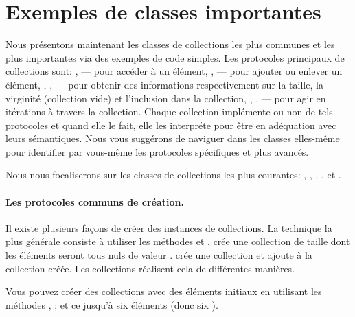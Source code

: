 \documentclass[a4paper,10pt,twoside]{book}
\begin{document}
\section{Exemples de classes importantes}
Nous présentons maintenant les classes de collections les plus communes et les plus importantes via des exemples de code simples.
Les protocoles principaux de collections sont: ,  --- pour accéder à un élément, ,  --- pour ajouter ou enlever un élément, , ,  --- pour obtenir des informations respectivement sur la taille, la virginité (collection vide) et l'inclusion dans la collection, , ,  --- pour agir en itérations à travers la collection.
Chaque collection implémente ou non de tels protocoles et quand elle 
le fait, elle les interpréte pour être en adéquation avec leurs sémantiques.
Nous vous suggérons de naviguer dans les classes elles-même pour
identifier par vous-même les protocoles spécifiques et plus avancés.

Nous nous focaliserons sur les classes de collections les plus courantes:
, , , ,  et .

\paragraph{Les protocoles communs de création.}
Il existe plusieurs façons de créer des instances de collections.
La technique la plus générale consiste à utiliser les méthodes
 et .
 crée une collection de taille  
dont les éléments seront tous nuls \cad de valeur . 
  crée une collection
et ajoute  à la collection créée. 
Les collections réalisent cela de différentes manières.

Vous pouvez créer des collections avec des éléments initiaux
en utilisant les méthodes \mbox{,}
 \etc; et ce jusqu'à 
six éléments (donc six ).
\end{document}
